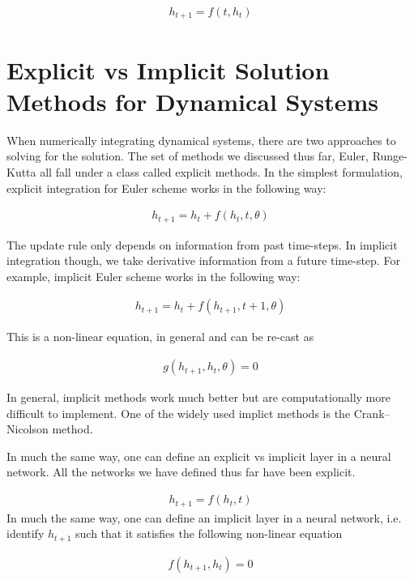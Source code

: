 \documentclass[book.tex]{subfiles}
\begin{document}
\begin{align}
    {h}_{t+1}= f(t,{h}_{t})
\end{align}

\section{Explicit vs Implicit Solution Methods for Dynamical Systems}


When numerically integrating dynamical systems, there are two approaches to solving for the solution.  The set of methods we discussed thus far, Euler, Runge-Kutta all fall under a class called explicit methods.  In the simplest formulation, explicit integration for Euler scheme works in the following way:

\begin{align}
    h_{t+1} = h_{t} + f(h_t,t,\theta)
\end{align}

The update rule only depends on information from past time-steps. In implicit integration though, we take derivative information from a future time-step.  For example, implicit Euler scheme works in the following way:

\begin{align}
    h_{t+1} = h_{t} + f(h_{t+1},t+1,\theta)
\end{align}

This is a non-linear equation, in general and can be re-cast as

\begin{align}
    g(h_{t+1},h_{t},\theta) = 0
\end{align}

In general, implicit methods work much better but are computationally more difficult to implement.  One of the widely used implict methods is the Crank–Nicolson method.

In much the same way, one can define an explicit vs implicit layer in a neural network. All the networks we have defined thus far have been explicit.

\begin{align}
h_{t+1} = f(h_{t},t)
\end{align}
In much the same way, one can define an implicit layer in a neural network, i.e. identify $h_{t+1}$ such that it satisfies the following non-linear equation \cite{amos2017optnet}

\begin{align}
f(h_{t+1},h_{t}) = 0
\end{align}
\end{document}
